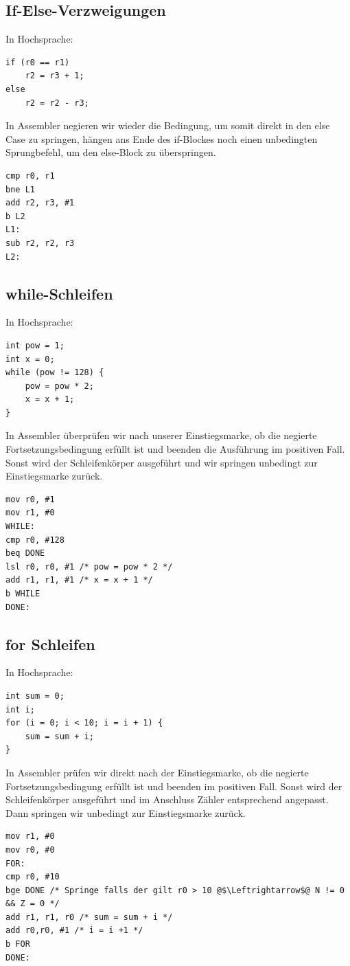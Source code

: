 \documentclass[a4paper,12pt,leqno]{article}
\begin{document}
\subsection{If-Else-Verzweigungen}
In Hochsprache:
\begin{lstlisting}
if (r0 == r1)
	r2 = r3 + 1;
else
	r2 = r2 - r3;
\end{lstlisting}

In Assembler negieren wir wieder die Bedingung, um somit direkt in den else Case zu springen, hängen ans Ende des if-Blockes noch einen unbedingten Sprungbefehl, um den else-Block zu überspringen.
\begin{lstlisting}
cmp r0, r1
bne L1
add r2, r3, #1
b L2
L1:
sub r2, r2, r3
L2:
\end{lstlisting}

\subsection{while-Schleifen}
In Hochsprache:
\begin{lstlisting}
int pow = 1;
int x = 0;
while (pow != 128) {
	pow = pow * 2;
	x = x + 1; 
}
\end{lstlisting}
In Assembler überprüfen wir nach unserer Einstiegsmarke, ob die negierte Fortsetzungsbedingung erfüllt ist und beenden die Ausführung im positiven Fall. Sonst wird der Schleifenkörper ausgeführt und wir springen unbedingt zur Einstiegsmarke zurück.
\begin{lstlisting}
mov r0, #1
mov r1, #0
WHILE:
cmp r0, #128
beq DONE
lsl r0, r0, #1 /* pow = pow * 2 */
add r1, r1, #1 /* x = x + 1 */
b WHILE
DONE: 
\end{lstlisting}

\subsection{for Schleifen}
In Hochsprache:
\begin{lstlisting}
int sum = 0;
int i;
for (i = 0; i < 10; i = i + 1) {
	sum = sum + i;
}
\end{lstlisting}

In Assembler prüfen wir direkt nach der Einstiegsmarke, ob die negierte Fortsetzungsbedingung erfüllt ist und beenden im positiven Fall. Sonst wird der Schleifenkörper ausgeführt und im Anschluss Zähler entsprechend angepasst. Dann springen wir unbedingt zur Einstiegsmarke zurück.
\begin{lstlisting}
mov r1, #0
mov r0, #0
FOR:
cmp r0, #10
bge DONE /* Springe falls der gilt r0 > 10 @$\Leftrightarrow$@ N != 0 && Z = 0 */
add r1, r1, r0 /* sum = sum + i */
add r0,r0, #1 /* i = i +1 */
b FOR
DONE:
\end{lstlisting}
\end{document}
